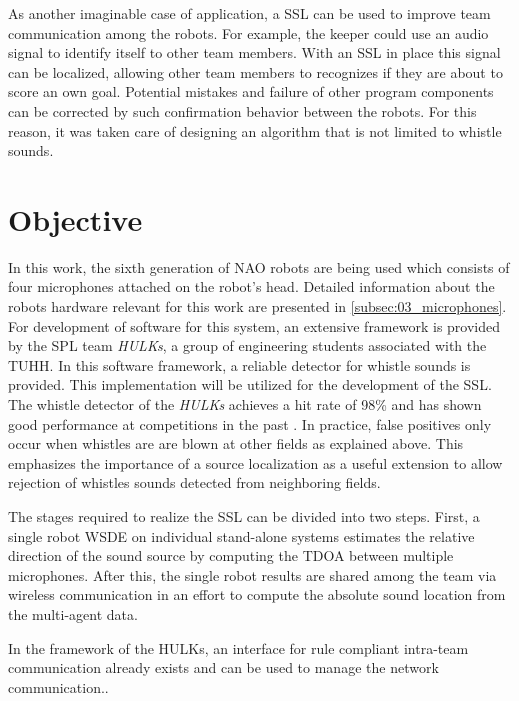 As another imaginable case of application, a \ac{SSL} can be used to improve team
communication among the robots.
For example, the keeper could use an audio signal to identify itself to other team
members. With an \ac{SSL} in place this signal can be localized, allowing other
team members to recognizes if they are about to score an own goal.
Potential mistakes and failure of other program components can be corrected by such
confirmation behavior between the robots.
For this reason, it was taken care of designing an algorithm that is not
limited to whistle sounds.

\section{Objective}
\label{sec:01_objective}

In this work, the sixth generation of NAO robots are being used
which consists of four microphones attached on the robot's head.
Detailed information about the robots hardware relevant for this work are presented
in \cref{subsec:03_microphones}.
For development of software for this system, an extensive framework is provided by
the \ac{SPL} team \textit{HULKs}, a group of engineering students associated
with the \ac{TUHH}.
In this software framework, a reliable detector for whistle sounds is provided.
This implementation will be utilized for the development of the \ac{SSL}. The
whistle detector of the \textit{HULKs} achieves a hit rate of 98\si{\percent}
and has shown good performance at competitions in the past \cite{Hasselbring}.
 In practice, false positives only occur when whistles are are blown
at other fields as explained above. This emphasizes the importance of
a source localization as a useful extension to allow rejection of whistles
sounds detected from neighboring fields.

The stages required to realize the \ac{SSL} can be divided into two steps.
First, a single robot \ac{WSDE} on individual stand-alone systems estimates the
relative direction of the sound source by computing the \ac{TDOA} between
multiple microphones. After this, the single robot results are shared among the team
via wireless communication in an effort to compute the absolute sound location
from the multi-agent data.

In the framework of the HULKs, an interface for rule compliant intra-team
communication already exists and can be used to manage the network
communication..


